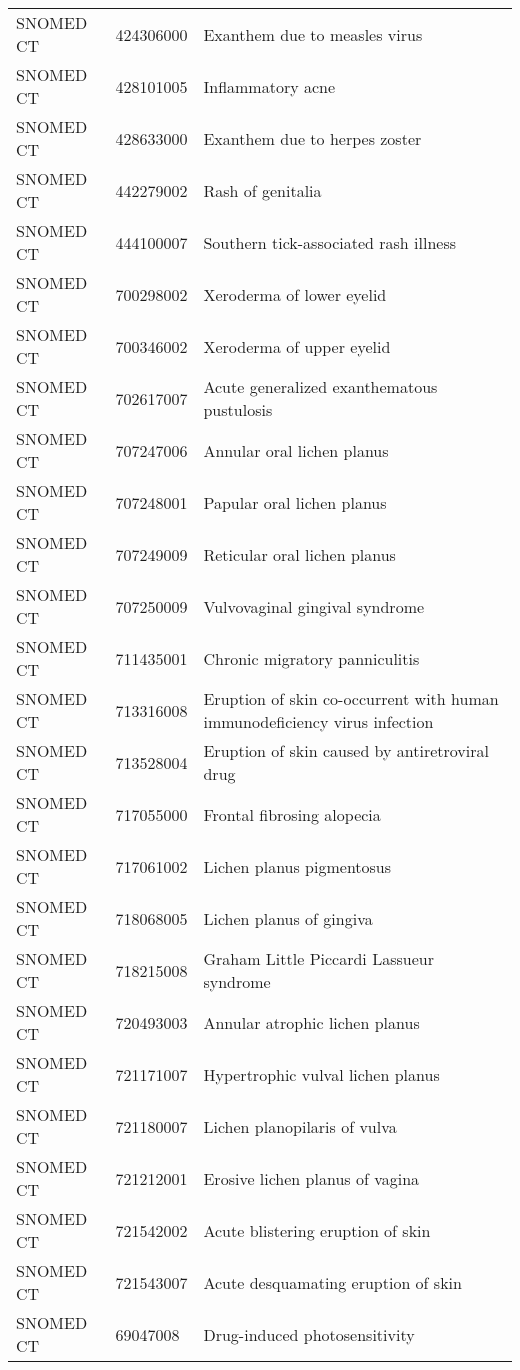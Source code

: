 \begin{longtable}{p{}p{}p{}}
  SNOMED CT & 424306000 & Exanthem due to measles virus \\ 
  SNOMED CT & 428101005 & Inflammatory acne \\ 
  SNOMED CT & 428633000 & Exanthem due to herpes zoster \\ 
  SNOMED CT & 442279002 & Rash of genitalia \\ 
  SNOMED CT & 444100007 & Southern tick-associated rash illness \\ 
  SNOMED CT & 700298002 & Xeroderma of lower eyelid \\ 
  SNOMED CT & 700346002 & Xeroderma of upper eyelid \\ 
  SNOMED CT & 702617007 & Acute generalized exanthematous pustulosis \\ 
  SNOMED CT & 707247006 & Annular oral lichen planus \\ 
  SNOMED CT & 707248001 & Papular oral lichen planus \\ 
  SNOMED CT & 707249009 & Reticular oral lichen planus \\ 
  SNOMED CT & 707250009 & Vulvovaginal gingival syndrome \\ 
  SNOMED CT & 711435001 & Chronic migratory panniculitis \\ 
  SNOMED CT & 713316008 & Eruption of skin co-occurrent with human immunodeficiency virus infection \\ 
  SNOMED CT & 713528004 & Eruption of skin caused by antiretroviral drug \\ 
  SNOMED CT & 717055000 & Frontal fibrosing alopecia \\ 
  SNOMED CT & 717061002 & Lichen planus pigmentosus \\ 
  SNOMED CT & 718068005 & Lichen planus of gingiva \\ 
  SNOMED CT & 718215008 & Graham Little Piccardi Lassueur syndrome \\ 
  SNOMED CT & 720493003 & Annular atrophic lichen planus \\ 
  SNOMED CT & 721171007 & Hypertrophic vulval lichen planus \\ 
  SNOMED CT & 721180007 & Lichen planopilaris of vulva \\ 
  SNOMED CT & 721212001 & Erosive lichen planus of vagina \\ 
  SNOMED CT & 721542002 & Acute blistering eruption of skin \\ 
  SNOMED CT & 721543007 & Acute desquamating eruption of skin \\ 
  SNOMED CT & 69047008 & Drug-induced photosensitivity \\ 

\end{longtable}
